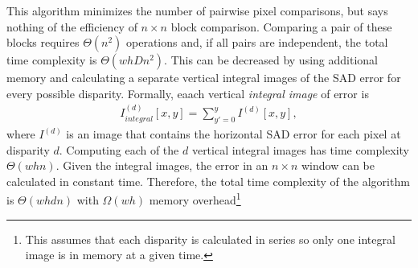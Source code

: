 \documentclass{article}
\begin{document}
\begin{figure}
    \centering
    \caption{
    }
    \label{fig:images}
\end{figure}

This algorithm minimizes the number of pairwise pixel comparisons, but says
nothing of the efficiency of $n \times n$ block comparison. Comparing a pair of
these blocks requires $\Theta(n^2)$ operations and, if all pairs are
independent, the total time complexity is $\Theta(w h D n^2)$. This can be
decreased by using additional memory and calculating a separate vertical
integral images of the SAD error for every possible disparity. Formally, eaach
vertical \textit{integral image} of error is
\begin{align*}
    I_{integral}^{(d)}[x, y] = \sum_{y' = 0}^y I^{(d)}[x, y],
\end{align*}
where $I^{(d)}$ is an image that contains the horizontal SAD error for each
pixel at disparity $d$. Computing each of the $d$ vertical integral images has
time complexity $\Theta(w h n)$. Given the integral images, the error in an $n
\times n$ window can be calculated in constant time. Therefore, the total time
complexity of the algorithm is $\Theta(w h d n)$ with $\Omega(w h)$ memory
overhead\footnote{This assumes that each disparity is calculated in series so
only one integral image is in memory at a given time.}
\end{document}
